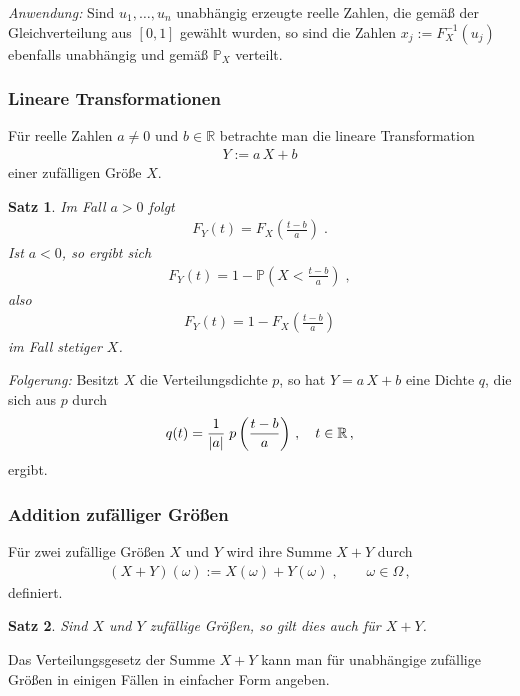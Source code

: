\documentclass[ngerman,draft,parskip=half,twoside]{scrartcl}
\newtheorem{thm}{Satz}[section]
\DeclarePairedDelimiter{\abs}{\lvert}{\rvert}
\newcommand*{\R}{\mathbb{R}}      %
\newcommand*{\WKM}{\mathbb{P}}      %
\begin{document}
\textit{Anwendung:}
Sind $u_1,\dotsc,u_n$ unabhängig erzeugte reelle Zahlen, die gemäß der
Gleichverteilung aus $[0,1]$ gewählt wurden, so sind die Zahlen $x_j:=
F_X^{-1}(u_j)$ ebenfalls unabhängig und gemäß $\WKM_X$ verteilt.

\subsubsection{Lineare Transformationen}

Für reelle Zahlen $a\not=0$ und $b\in\R$ betrachte man die lineare
Transformation
\begin{gather*}
  Y:=a\,X+ b
\end{gather*}
einer zufälligen Größe $X$.

\begin{thm}
  Im Fall $a>0$ folgt
  \begin{gather*}
    F_Y(t)=F_X\left(\frac{t-b}{a}\right)\;.
  \end{gather*}
  Ist $a<0$, so ergibt sich
  \begin{gather*}
    F_Y(t)=1-\WKM\left(X<\frac{t-b}{a}\right)\;,
  \end{gather*}
  also
  \begin{gather*}
    F_Y(t)=1-F_X\left(\frac{t-b}{a}\right)
  \end{gather*}
  im Fall stetiger $X$.
\end{thm}

\textit{Folgerung:}
Besitzt $X$ die Verteilungsdichte $p$, so hat $Y=a\,X+b$ eine Dichte $q$, die
sich aus $p$ durch
\begin{gather*}
  q(t)=\frac{1}{\abs{a}}\;p\left(\frac{t-b}{a}\right)\,,\quad t\in\R\,,
\end{gather*}
ergibt.

\subsubsection{Addition zufälliger Größen}

Für zwei zufällige Größen $X$  und $Y$ wird ihre Summe $X+Y$ durch
\begin{gather*}
  (X+Y)(\omega):=X(\omega)+Y(\omega)\;,\qquad \omega\in\Omega\,,
\end{gather*}
definiert.

\begin{thm}
  Sind $X$ und $Y$ zufällige Größen, so gilt dies auch für $X+Y$.
\end{thm}
Das Verteilungsgesetz der Summe $X+Y$ kann man für unabhängige zufällige Größen
in einigen Fällen in einfacher Form angeben.
\end{document}
